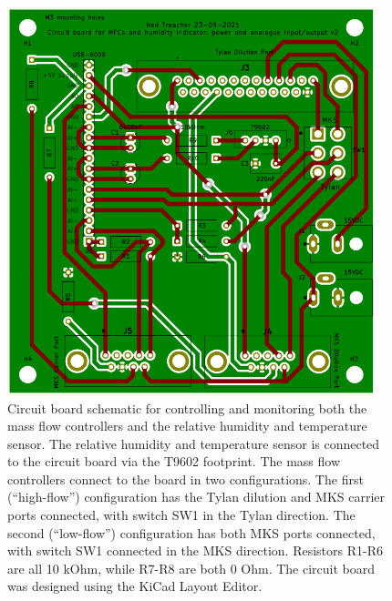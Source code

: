 \documentclass[
  a4paper,
]{scrbook}
\begin{document}
\begin{figure}

{\centering \includegraphics[width=0.95\textwidth,height=\textheight]{figures/ch5/current_PCB.png}

}

\caption{\label{fig-current-pcb-design}Circuit board schematic for
controlling and monitoring both the mass flow controllers and the
relative humidity and temperature sensor. The relative humidity and
temperature sensor is connected to the circuit board via the T9602
footprint. The mass flow controllers connect to the board in two
configurations. The first (``high-flow'') configuration has the Tylan
dilution and MKS carrier ports connected, with switch SW1 in the Tylan
direction. The second (``low-flow'') configuration has both MKS ports
connected, with switch SW1 connected in the MKS direction. Resistors
R1-R6 are all 10 kOhm, while R7-R8 are both 0 Ohm. The circuit board was
designed using the KiCad Layout Editor.}

\end{figure}
\end{document}
